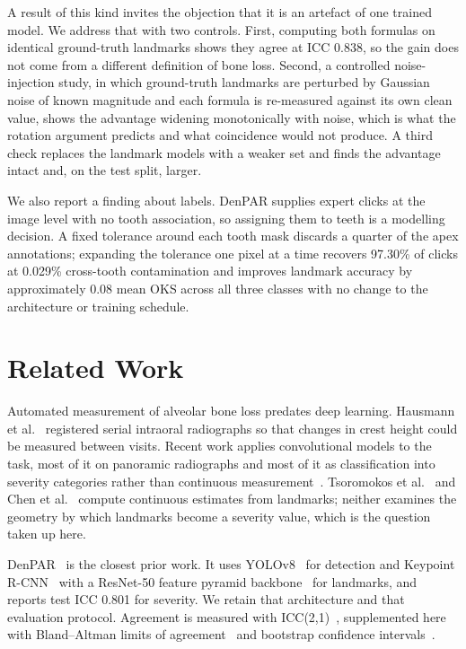 \documentclass[conference]{IEEEtran}
\begin{document}
A result of this kind invites the objection that it is an artefact of one trained model. We address that with two controls. First, computing both formulas on identical ground-truth landmarks shows they agree at ICC 0.838, so the gain does not come from a different definition of bone loss. Second, a controlled noise-injection study, in which ground-truth landmarks are perturbed by Gaussian noise of known magnitude and each formula is re-measured against its own clean value, shows the advantage widening monotonically with noise, which is what the rotation argument predicts and what coincidence would not produce. A third check replaces the landmark models with a weaker set and finds the advantage intact and, on the test split, larger.

We also report a finding about labels. DenPAR supplies expert clicks at the image level with no tooth association, so assigning them to teeth is a modelling decision. A fixed tolerance around each tooth mask discards a quarter of the apex annotations; expanding the tolerance one pixel at a time recovers 97.30\% of clicks at 0.029\% cross-tooth contamination and improves landmark accuracy by approximately 0.08 mean OKS across all three classes with no change to the architecture or training schedule.

\section{Related Work}
\label{sec:related}

Automated measurement of alveolar bone loss predates deep learning. Hausmann et al.~\cite{hausmann1992computerized} registered serial intraoral radiographs so that changes in crest height could be measured between visits. Recent work applies convolutional models to the task, most of it on panoramic radiographs and most of it as classification into severity categories rather than continuous measurement~\cite{schwendicke2020dl_dental,mol2019ai_dental}. Tsoromokos et al.~\cite{tsoromokos2022estimation} and Chen et al.~\cite{chen2023automatic} compute continuous estimates from landmarks; neither examines the geometry by which landmarks become a severity value, which is the question taken up here.

DenPAR~\cite{denpar2026} is the closest prior work. It uses YOLOv8~\cite{jocher2023yolo} for detection and Keypoint R-CNN~\cite{he2017mask,ren2015faster} with a ResNet-50 feature pyramid backbone~\cite{lin2017feature} for landmarks, and reports test ICC 0.801 for severity. We retain that architecture and that evaluation protocol. Agreement is measured with ICC(2,1)~\cite{shrout1979icc,koo2016icc}, supplemented here with Bland--Altman limits of agreement~\cite{bland1986statistical} and bootstrap confidence intervals~\cite{efron1979bootstrap}.
\end{document}
